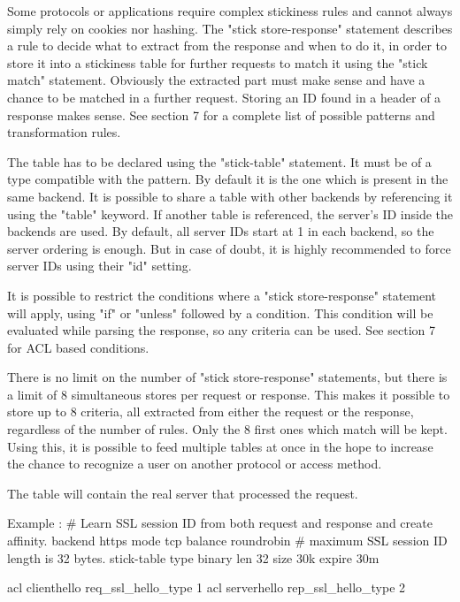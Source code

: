\begin{description}
\begin{itemize}
  Some protocols or applications require complex stickiness rules and cannot
  always simply rely on cookies nor hashing. The "stick store-response"
  statement  describes a rule to decide what to extract from the response and
  when to do it, in order to store it into a stickiness table for further
  requests to match it using the "stick match" statement. Obviously the
  extracted part must make sense and have a chance to be matched in a further
  request. Storing an ID found in a header of a response makes sense.
  See section 7 for a complete list of possible patterns and transformation
  rules.

  The table has to be declared using the "stick-table" statement. It must be of
  a type compatible with the pattern. By default it is the one which is present
  in the same backend. It is possible to share a table with other backends by
  referencing it using the "table" keyword. If another table is referenced,
  the server's ID inside the backends are used. By default, all server IDs
  start at 1 in each backend, so the server ordering is enough. But in case of
  doubt, it is highly recommended to force server IDs using their "id" setting.

  It is possible to restrict the conditions where a "stick store-response"
  statement will apply, using "if" or "unless" followed by a condition. This
  condition will be evaluated while parsing the response, so any criteria can
  be used. See section 7 for ACL based conditions.

  There is no limit on the number of "stick store-response" statements, but
  there is a limit of 8 simultaneous stores per request or response. This
  makes it possible to store up to 8 criteria, all extracted from either the
  request or the response, regardless of the number of rules. Only the 8 first
  ones which match will be kept. Using this, it is possible to feed multiple
  tables at once in the hope to increase the chance to recognize a user on
  another protocol or access method.

  The table will contain the real server that processed the request.

  Example :
    # Learn SSL session ID from both request and response and create affinity.
    backend https
        mode tcp
        balance roundrobin
        # maximum SSL session ID length is 32 bytes.
        stick-table type binary len 32 size 30k expire 30m

        acl clienthello req_ssl_hello_type 1
        acl serverhello rep_ssl_hello_type 2


\end{itemize}
\end{description}
